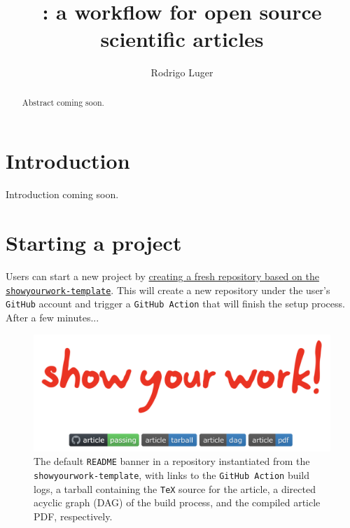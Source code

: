 \documentclass[twocolumn]{aastex631}
\begin{document}
\title{\showyourwork: a workflow for open source scientific articles}

\author[0000-0002-0296-3826]{Rodrigo Luger}

\begin{abstract}
    Abstract coming soon.
\end{abstract}

\section{Introduction}

Introduction coming soon.

\section{Starting a project}
\label{sec:start}
%
Users can start a new project by \href{https://github.com/rodluger/showyourwork-template/generate}{creating a fresh repository based on the \texttt{showyourwork-template}}.
This will create a new repository under the user's \texttt{GitHub} account and trigger a \texttt{GitHub Action} that will finish the setup process.
After a few minutes...
%
\begin{figure}[ht!]
    \begin{centering}
        \includegraphics[width=\linewidth]{static/banner.png}
        \caption{
            The default \texttt{README} banner in a repository instantiated from the \texttt{showyourwork-template}, with links to the \texttt{GitHub Action} build logs, a tarball containing the \texttt{TeX} source for the article, a directed acyclic graph (DAG) of the build process, and the compiled article PDF, respectively.
        }
        \label{fig:banner}
    \end{centering}
\end{figure}
%
\end{document}
